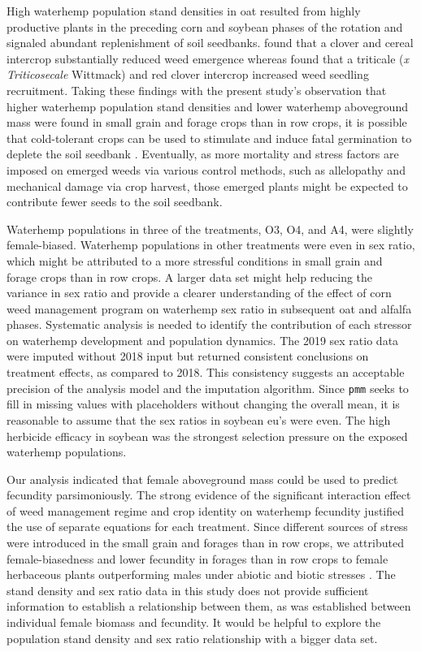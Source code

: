 \documentclass[
]{article}
\begin{document}
High waterhemp population stand densities in oat resulted from highly productive plants in the preceding corn and soybean phases of the rotation and signaled abundant replenishment of soil seedbanks. \citet{dykeSuppressionCouchGrass1976} found that a clover and cereal intercrop substantially reduced weed emergence whereas \citet{heggenstallerSeasonalPatternsPostdispersal2006} found that a triticale (\emph{x Triticosecale} Wittmack) and red clover intercrop increased weed seedling recruitment. Taking these findings with the present study's observation that higher waterhemp population stand densities and lower waterhemp aboveground mass were found in small grain and forage crops than in row crops, it is possible that cold-tolerant crops can be used to stimulate and induce fatal germination to deplete the soil seedbank \citep{davisCroppingSystemEffects2003, gallandtEffectCovercroppingSystems2005}. Eventually, as more mortality and stress factors are imposed on emerged weeds via various control methods, such as allelopathy and mechanical damage via crop harvest, those emerged plants might be expected to contribute fewer seeds to the soil seedbank.

Waterhemp populations in three of the treatments, O3, O4, and A4, were slightly female-biased. Waterhemp populations in other treatments were even in sex ratio, which might be attributed to a more stressful conditions in small grain and forage crops than in row crops. A larger data set might help reducing the variance in sex ratio and provide a clearer understanding of the effect of corn weed management program on waterhemp sex ratio in subsequent oat and alfalfa phases. Systematic analysis is needed to identify the contribution of each stressor on waterhemp development and population dynamics. The 2019 sex ratio data were imputed without 2018 input but returned consistent conclusions on treatment effects, as compared to 2018. This consistency suggests an acceptable precision of the analysis model and the imputation algorithm. Since \texttt{pmm} seeks to fill in missing values with placeholders without changing the overall mean, it is reasonable to assume that the sex ratios in soybean eu's were even. The high herbicide efficacy in soybean was the strongest selection pressure on the exposed waterhemp populations.

Our analysis indicated that female aboveground mass could be used to predict fecundity parsimoniously. The strong evidence of the significant interaction effect of weed management regime and crop identity on waterhemp fecundity justified the use of separate equations for each treatment. Since different sources of stress were introduced in the small grain and forages than in row crops, we attributed female-biasedness and lower fecundity in forages than in row crops to female herbaceous plants outperforming males under abiotic and biotic stresses \citep{juvanySexrelatedDifferencesStress2015}. The stand density and sex ratio data in this study does not provide sufficient information to establish a relationship between them, as was established between individual female biomass and fecundity. It would be helpful to explore the population stand density and sex ratio relationship with a bigger data set.
\end{document}
